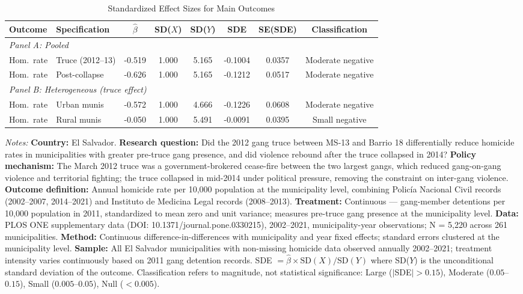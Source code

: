\begin{table}[H]
\centering
\caption{Standardized Effect Sizes for Main Outcomes}
\label{tab:sde}
\begin{threeparttable}
\footnotesize
\begin{tabular}{llcccccc}
\toprule
Outcome & Specification & $\hat{\beta}$ & SD($X$) & SD($Y$) & SDE & SE(SDE) & Classification \\
\midrule
\multicolumn{8}{l}{\textit{Panel A: Pooled}} \\
Hom.\ rate & Truce (2012--13) & -0.519 & 1.000 & 5.165 & -0.1004 & 0.0357 & Moderate negative \\
Hom.\ rate & Post-collapse & -0.626 & 1.000 & 5.165 & -0.1212 & 0.0517 & Moderate negative \\
\midrule
\multicolumn{8}{l}{\textit{Panel B: Heterogeneous (truce effect)}} \\
Hom.\ rate & Urban munis & -0.572 & 1.000 & 4.666 & -0.1226 & 0.0608 & Moderate negative \\
Hom.\ rate & Rural munis & -0.050 & 1.000 & 5.491 & -0.0091 & 0.0395 & Small negative \\
\bottomrule
\end{tabular}
\begin{tablenotes}[flushleft]
\small \RaggedRight
\item \textit{Notes:} \textbf{Country:} El Salvador. \textbf{Research question:} Did the 2012 gang truce between MS-13 and Barrio 18 differentially reduce homicide rates in municipalities with greater pre-truce gang presence, and did violence rebound after the truce collapsed in 2014? \textbf{Policy mechanism:} The March 2012 truce was a government-brokered cease-fire between the two largest gangs, which reduced gang-on-gang violence and territorial fighting; the truce collapsed in mid-2014 under political pressure, removing the constraint on inter-gang violence. \textbf{Outcome definition:} Annual homicide rate per 10,000 population at the municipality level, combining Polic\'{i}a Nacional Civil records (2002--2007, 2014--2021) and Instituto de Medicina Legal records (2008--2013). \textbf{Treatment:} Continuous --- gang-member detentions per 10,000 population in 2011, standardized to mean zero and unit variance; measures pre-truce gang presence at the municipality level. \textbf{Data:} PLOS ONE supplementary data (DOI: 10.1371/journal.pone.0330215), 2002--2021, municipality-year observations; N = 5,220 across 261 municipalities. \textbf{Method:} Continuous difference-in-differences with municipality and year fixed effects; standard errors clustered at the municipality level. \textbf{Sample:} All El Salvador municipalities with non-missing homicide data observed annually 2002--2021; treatment intensity varies continuously based on 2011 gang detention records. SDE $= \hat{\beta} \times \text{SD}(X) / \text{SD}(Y)$ where SD($Y$) is the unconditional standard deviation of the outcome. Classification refers to magnitude, not statistical significance: Large ($|$SDE$| > 0.15$), Moderate ($0.05$--$0.15$), Small ($0.005$--$0.05$), Null ($< 0.005$).
\end{tablenotes}
\end{threeparttable}
\end{table}
